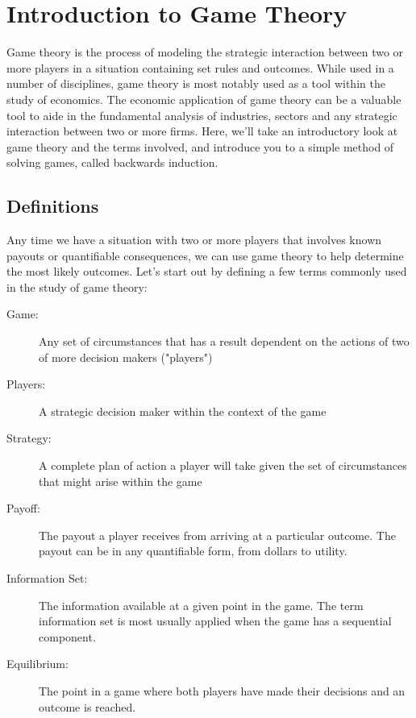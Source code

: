\documentclass[11pt]{article} %
\begin{document}


\section{Introduction to Game Theory}


Game theory is the process of modeling the strategic interaction between two or more players in a situation containing set rules and outcomes. While used in a number of disciplines, game theory is most notably used as a tool within the study of economics. The economic application of game theory can be a valuable tool to aide in the fundamental analysis of industries, sectors and any strategic interaction between two or more firms. Here, we'll take an introductory look at game theory and the terms involved, and introduce you to a simple method of solving games, called backwards induction.

\subsection{Definitions} 
Any time we have a situation with two or more players that involves known payouts or quantifiable consequences, we can use game theory to help determine the most likely outcomes. 
Let's start out by defining a few terms commonly used in the study of game theory:

\begin{description}
\item[Game:] Any set of circumstances that has a result dependent on the actions of two of more decision makers ("players")
\item[Players:] A strategic decision maker within the context of the game
\item[Strategy:] A complete plan of action a player will take given the set of circumstances that might arise within the game
\item[Payoff:] The payout a player receives from arriving at a particular outcome. The payout can be in any quantifiable form, from dollars to utility.
\item[Information Set:] The information available at a given point in the game. The term information set is most usually applied when the game has a sequential component.
\item[Equilibrium:] The point in a game where both players have made their decisions and an outcome is reached.
\end{description}
\end{document}
